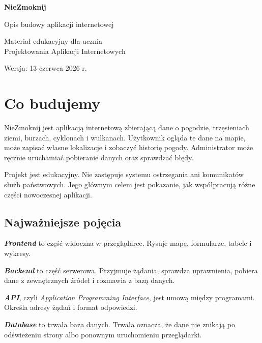 \documentclass[14pt,a5paper,oneside]{extarticle}
\newcommand{\term}[1]{\textbf{\textit{#1}}}
\begin{document}
\begin{titlepage}
  \thispagestyle{empty}
  \centering
  \vspace*{18mm}
  {\LARGE\bfseries NieZmoknij\par}
  \vspace{5mm}
  {\Large Opis budowy aplikacji internetowej\par}
  \vspace{13mm}
  {\large Materiał edukacyjny dla ucznia\\Projektowania Aplikacji Internetowych\par}
  \vfill
  {\large Wersja: 13 czerwca 2026 r.\par}
\end{titlepage}

\tableofcontents
\clearpage

\section{Co budujemy}

NieZmoknij jest aplikacją internetową zbierającą dane o pogodzie,
trzęsieniach ziemi, burzach, cyklonach i wulkanach. Użytkownik ogląda te dane
na mapie, może zapisać własne lokalizacje i zobaczyć historię pogody.
Administrator może ręcznie uruchamiać pobieranie danych oraz sprawdzać błędy.

Projekt jest edukacyjny. Nie zastępuje systemu ostrzegania ani komunikatów
służb państwowych. Jego głównym celem jest pokazanie, jak współpracują różne
części nowoczesnej aplikacji.

\subsection{Najważniejsze pojęcia}

\term{Frontend} to część widoczna w przeglądarce. Rysuje mapę, formularze,
tabele i wykresy.

\term{Backend} to część serwerowa. Przyjmuje żądania, sprawdza uprawnienia,
pobiera dane z zewnętrznych źródeł i rozmawia z bazą danych.

\term{API}, czyli \textit{Application Programming Interface}, jest umową
między programami. Określa adresy żądań i format odpowiedzi.

\term{Database} to trwała baza danych. Trwała oznacza, że dane nie znikają
po odświeżeniu strony albo ponownym uruchomieniu przeglądarki.
\end{document}
